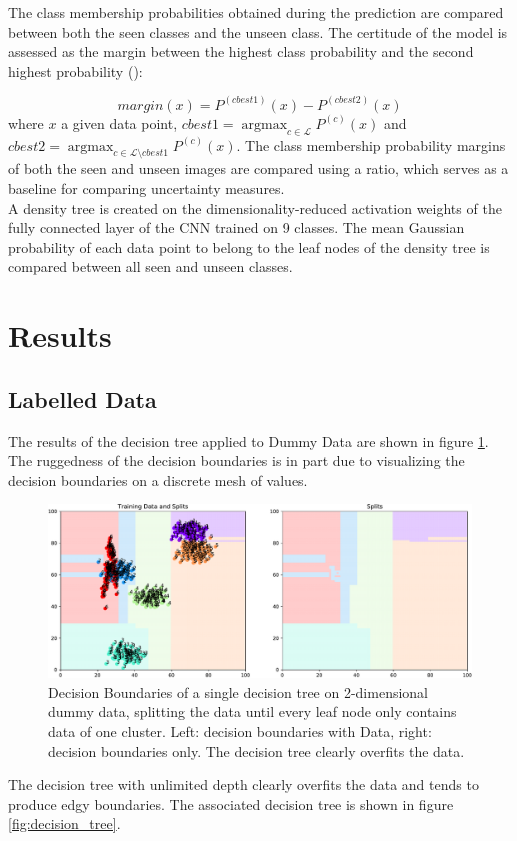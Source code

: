 \documentclass{article}
\DeclareMathOperator{\argmax}{argmax}
\begin{document}
The class membership probabilities obtained during the prediction are compared between both the seen classes and the unseen class. The certitude of the model is assessed as the margin between the highest class probability and the second highest probability (\cite{ouerghemmi_two-step_2017}):

\begin{equation}
    margin(x)=P^{(cbest1)}(x)-P^{(cbest2)}(x)
\end{equation}
where $x$ a given data point, $cbest1=\argmax_{c\in\mathcal{L}}P^{(c)}(x)$ and $cbest2=\argmax_{c\in\mathcal{L}\setminus cbest1}P^{(c)}(x)$. The class membership probability margins of both the seen and unseen images are compared using a ratio, which serves as a baseline for comparing uncertainty measures.\\

A density tree is created on the dimensionality-reduced activation weights of the fully connected layer of the CNN trained on 9 classes. The mean Gaussian probability of each data point to belong to the leaf nodes of the density tree is compared between all seen and unseen classes.

\section{Results}



\subsection{Labelled Data}
The results of the decision tree applied to Dummy Data are shown in figure \ref{fig:decision-boundaries}. The ruggedness of the decision boundaries is in part due to visualizing the decision boundaries on a discrete mesh of values.

\begin{figure}[H]
    \centering
    \includegraphics[width=\textwidth]{decision_boundaries.pdf}
    \caption{Decision Boundaries of a single decision tree on 2-dimensional dummy data, splitting the data until every leaf node only contains data of one cluster. Left: decision boundaries with Data, right: decision boundaries only. The decision tree clearly overfits the data.}
    \label{fig:decision-boundaries}
\end{figure}
The decision tree with unlimited depth clearly overfits the data and tends to produce edgy boundaries. The associated decision tree is shown in figure \ref{fig:decision_tree}.
\end{document}
